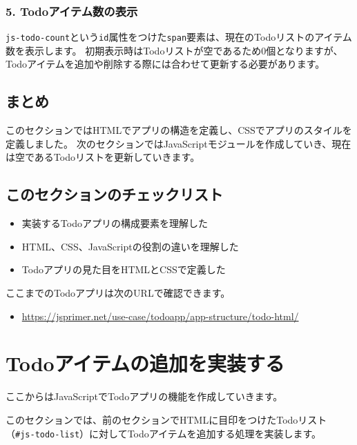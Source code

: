 \hypertarget{comment-todo-count}{%
\subsubsection{5. Todoアイテム数の表示}\label{comment-todo-count}}

\texttt{js-todo-count}という\texttt{id}属性をつけた\texttt{span}要素は、現在のTodoリストのアイテム数を表示します。
初期表示時はTodoリストが空であるため0個となりますが、Todoアイテムを追加や削除する際には合わせて更新する必要があります。

\hypertarget{conclusion}{%
\subsection{まとめ}\label{conclusion}}

このセクションではHTMLでアプリの構造を定義し、CSSでアプリのスタイルを定義しました。
次のセクションではJavaScriptモジュールを作成していき、現在は空であるTodoリストを更新していきます。

\hypertarget{section-checklist}{%
\subsection{このセクションのチェックリスト}\label{section-checklist}}

\begin{itemize}
\item
  実装するTodoアプリの構成要素を理解した
\item
  HTML、CSS、JavaScriptの役割の違いを理解した
\item
  Todoアプリの見た目をHTMLとCSSで定義した
\end{itemize}

ここまでのTodoアプリは次のURLで確認できます。

\begin{itemize}
\item
  \url{https://jsprimer.net/use-case/todoapp/app-structure/todo-html/}
\end{itemize}

\hypertarget{form-event}{%
\section{Todoアイテムの追加を実装する}\label{form-event}}

ここからはJavaScriptでTodoアプリの機能を作成していきます。

このセクションでは、前のセクションでHTMLに目印をつけたTodoリスト（\texttt{\#js-todo-list}）に対してTodoアイテムを追加する処理を実装します。

